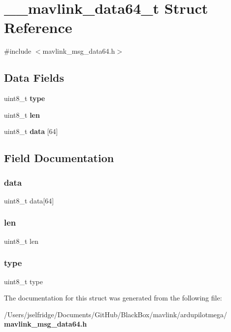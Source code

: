 \section{\+\_\+\+\_\+mavlink\+\_\+data64\+\_\+t Struct Reference}
\label{struct____mavlink__data64__t}


{\ttfamily \#include $<$mavlink\+\_\+msg\+\_\+data64.\+h$>$}

\subsection*{Data Fields}
\begin{DoxyCompactItemize}
\item 
uint8\+\_\+t \textbf{ type}
\item 
uint8\+\_\+t \textbf{ len}
\item 
uint8\+\_\+t \textbf{ data} [64]
\end{DoxyCompactItemize}


\subsection{Field Documentation}
\mbox{\label{struct____mavlink__data64__t_a6fcedd1c789a695a3a181a7a6624d368}} 
\subsubsection{data}
{\footnotesize\ttfamily uint8\+\_\+t data[64]}

\mbox{\label{struct____mavlink__data64__t_a5723e60ffd628510c699eddbce90be23}} 
\subsubsection{len}
{\footnotesize\ttfamily uint8\+\_\+t len}

\mbox{\label{struct____mavlink__data64__t_a1d127017fb298b889f4ba24752d08b8e}} 
\subsubsection{type}
{\footnotesize\ttfamily uint8\+\_\+t type}



The documentation for this struct was generated from the following file\+:\begin{DoxyCompactItemize}
\item 
/\+Users/jselfridge/\+Documents/\+Git\+Hub/\+Black\+Box/mavlink/ardupilotmega/\textbf{ mavlink\+\_\+msg\+\_\+data64.\+h}\end{DoxyCompactItemize}
